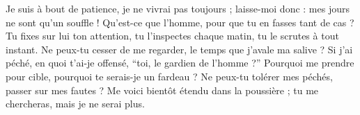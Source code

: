 
Je suis à bout de patience, je ne vivrai pas toujours ; laisse-moi donc : mes jours ne sont qu’un souffle !
Qu’est-ce que l’homme, pour que tu en fasses tant de cas ? Tu fixes sur lui ton attention,
tu l’inspectes chaque matin, tu le scrutes à tout instant.
Ne peux-tu cesser de me regarder, le temps que j’avale ma salive ? Si j’ai péché, en quoi t’ai-je offensé, “toi, le gardien de l’homme ?” Pourquoi me prendre pour cible, pourquoi te serais-je un fardeau ?
Ne peux-tu tolérer mes péchés, passer sur mes fautes ? Me voici bientôt étendu dans la poussière ; tu me chercheras, mais je ne serai plus.